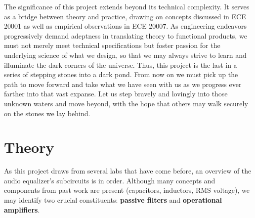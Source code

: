 \documentclass[notitlepage, 12pt]{report}
\begin{document}
The significance of this project extends beyond its technical complexity. 
It serves as a bridge between theory and practice, drawing on concepts 
discussed in ECE 20001 as well as empirical observations in ECE 20007. 
As engineering endeavors progressively demand adeptness in translating 
theory to functional products, we must not merely meet technical specifications 
but foster passion for
the underlying science of what we design, so that we may always strive to learn 
and illuminate the dark corners of the universe. Thus, this project is the last in a 
series of stepping stones into a dark pond. From now on we must pick up the path
to move forward and take what we have seen with us as we progress ever farther 
into that vast expanse. Let us step bravely and lovingly into those unknown waters and
move beyond, with the hope that others may walk securely on the stones we lay behind.

\newpage

\section*{Theory}
As this project draws from several labs that have come before, 
an overview of the audio equalizer's subcircuits is
in order. Although many concepts and components from past work are present 
(capacitors, inductors, RMS voltage), we may identify two crucial constituents:
\textbf{passive filters} and \textbf{operational amplifiers}. 
\end{document}
